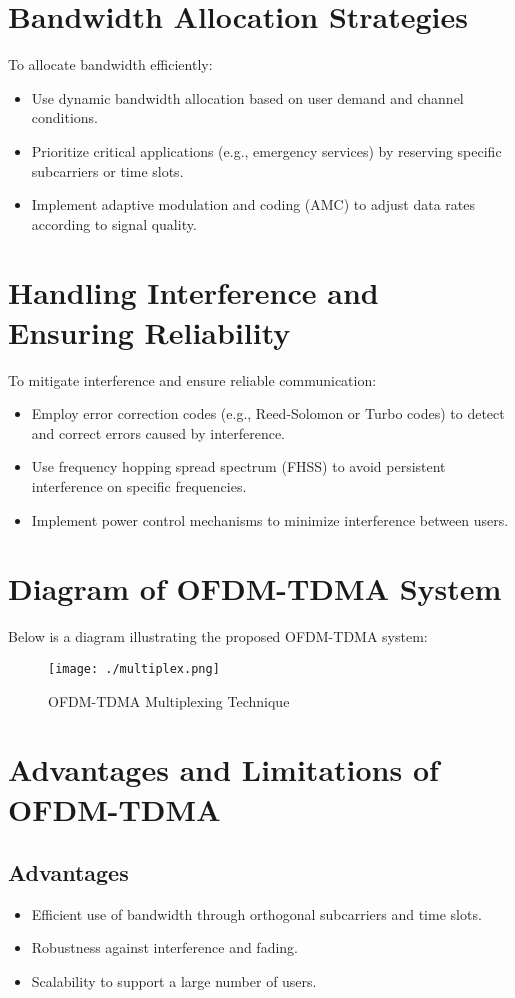 \documentclass[12pt]{article}
\begin{document}
\section*{Bandwidth Allocation Strategies}
To allocate bandwidth efficiently:
\begin{itemize}
    \item Use dynamic bandwidth allocation based on user demand and channel conditions.
    \item Prioritize critical applications (e.g., emergency services) by reserving specific subcarriers or time slots.
    \item Implement adaptive modulation and coding (AMC) to adjust data rates according to signal quality.
\end{itemize}

\section*{Handling Interference and Ensuring Reliability}
To mitigate interference and ensure reliable communication:
\begin{itemize}
    \item Employ error correction codes (e.g., Reed-Solomon or Turbo codes) to detect and correct errors caused by interference.
    \item Use frequency hopping spread spectrum (FHSS) to avoid persistent interference on specific frequencies.
    \item Implement power control mechanisms to minimize interference between users.
\end{itemize}

\section*{Diagram of OFDM-TDMA System}
Below is a diagram illustrating the proposed OFDM-TDMA system:

\begin{figure}[h]
    \centering
    \texttt{[image: ./multiplex.png]} %
    \caption{OFDM-TDMA Multiplexing Technique}
\end{figure}
\newpage
\section*{Advantages and Limitations of OFDM-TDMA}
\subsection*{Advantages}
\begin{itemize}
    \item Efficient use of bandwidth through orthogonal subcarriers and time slots.
    \item Robustness against interference and fading.
    \item Scalability to support a large number of users.
\end{itemize}
\end{document}
